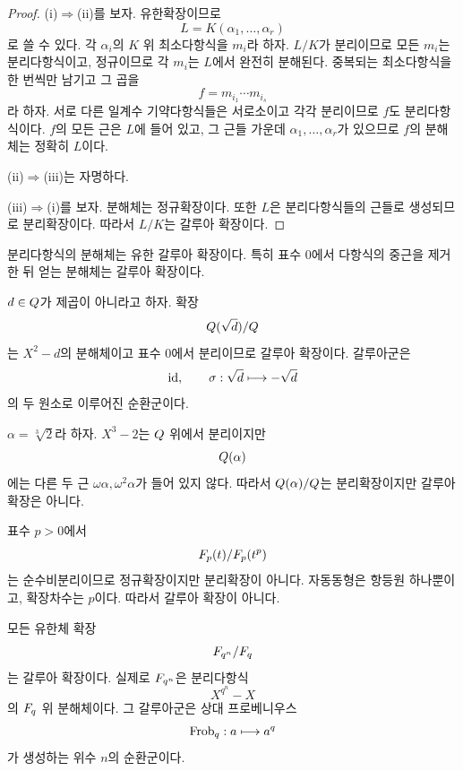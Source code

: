 \begin{proof}
(i)$\Rightarrow$(ii)를 보자. 유한확장이므로
\[
  L=K(\alpha_1,\dots,\alpha_r)
\]
로 쓸 수 있다. 각 $\alpha_i$의 $K$ 위 최소다항식을 $m_i$라 하자. $L/K$가 분리이므로 모든 $m_i$는 분리다항식이고, 정규이므로 각 $m_i$는 $L$에서 완전히 분해된다. 중복되는 최소다항식을 한 번씩만 남기고 그 곱을
\[
  f=m_{i_1}\cdots m_{i_s}
\]
라 하자. 서로 다른 일계수 기약다항식들은 서로소이고 각각 분리이므로 $f$도 분리다항식이다. $f$의 모든 근은 $L$에 들어 있고, 그 근들 가운데 $\alpha_1,\dots,\alpha_r$가 있으므로 $f$의 분해체는 정확히 $L$이다.

(ii)$\Rightarrow$(iii)는 자명하다.

(iii)$\Rightarrow$(i)를 보자. 분해체는 정규확장이다. 또한 $L$은 분리다항식들의 근들로 생성되므로 분리확장이다. 따라서 $L/K$는 갈루아 확장이다.
\end{proof}

\begin{corollary}
분리다항식의 분해체는 유한 갈루아 확장이다. 특히 표수 $0$에서 다항식의 중근을 제거한 뒤 얻는 분해체는 갈루아 확장이다.
\end{corollary}

\begin{example}[이차확장]
$d\in Q$가 제곱이 아니라고 하자. 확장
\[
  Q(\sqrt d)/Q
\]
는 $X^2-d$의 분해체이고 표수 $0$에서 분리이므로 갈루아 확장이다. 갈루아군은
\[
  \operatorname{id},\qquad
  \sigma:\sqrt d\longmapsto-\sqrt d
\]
의 두 원소로 이루어진 순환군이다.
\end{example}

\begin{example}
$\alpha=\sqrt[3]{2}$라 하자. $X^3-2$는 $Q$ 위에서 분리이지만
\[
  Q(\alpha)
\]
에는 다른 두 근 $\omega\alpha,\omega^2\alpha$가 들어 있지 않다. 따라서 $Q(\alpha)/Q$는 분리확장이지만 갈루아 확장은 아니다.
\end{example}

\begin{example}
표수 $p>0$에서
\[
  F_p(t)/F_p(t^p)
\]
는 순수비분리이므로 정규확장이지만 분리확장이 아니다. 자동동형은 항등원 하나뿐이고, 확장차수는 $p$이다. 따라서 갈루아 확장이 아니다.
\end{example}

\begin{example}[유한체 확장]
모든 유한체 확장
\[
  F_{q^n}/F_q
\]
는 갈루아 확장이다. 실제로 $F_{q^n}$은 분리다항식
\[
  X^{q^n}-X
\]
의 $F_q$ 위 분해체이다. 그 갈루아군은 상대 프로베니우스
\[
  \operatorname{Frob}_q:a\longmapsto a^q
\]
가 생성하는 위수 $n$의 순환군이다.
\end{example}

